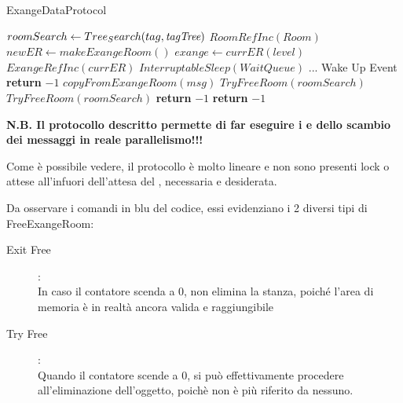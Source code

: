 \newpage

\begin{algorithm}
\caption{\Reader ExangeDataProtocol}\label{readExange}
\begin{algorithmic}[1]
\State $roomSearch \gets Tree_Search(tag, \textit{tagTree})$
    \State $RoomRefInc(Room)$
        \State $newER \gets makeExangeRoom()$
        {
        \color{red}
        \State $exange \gets currER(level)$
        \State $ExangeRefInc(currER)$
        }
        \State $InterruptableSleep(WaitQueue)$
        \State ...
        \State Wake Up Event
                \State \textbf{return} $-1$
            \EndIf
        \State $copyFromExangeRoom(msg)$ 
        \State $TryFreeRoom(roomSearch)$
    \Else
        \State $TryFreeRoom(roomSearch)$
        \State \textbf{return} $-1$
    \EndIf
\Else
    \State \textbf{return} $-1$
\EndIf
\EndProcedure
\end{algorithmic}
\end{algorithm}

\textbf{N.B. Il protocollo descritto permette di far eseguire i \Writer e \Reader dello scambio dei messaggi in reale
parallelismo!!!}

Come è possibile vedere, il protocollo è molto lineare e non sono presenti lock o attese all'infuori dell'attesa del
\Reader, necessaria e desiderata.

Da osservare i comandi in {\color{blue} blu} del codice, essi evidenziano i 2 diversi tipi di FreeExangeRoom:
\begin{description}
\item[Exit Free]:\\
In caso il contatore scenda a 0, non elimina la stanza, poiché l'area di memoria è in realtà ancora valida e
raggiungibile
\item[Try Free]:\\
Quando il contatore scende a 0, si può effettivamente procedere all'eliminazione dell'oggetto, poichè non è più
riferito da nessuno.
\end{description}

